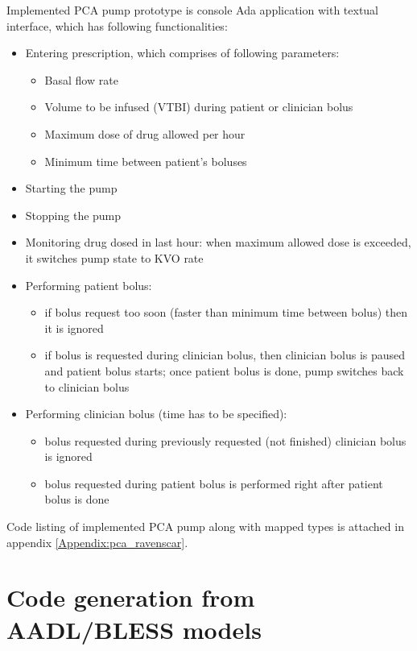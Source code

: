 Implemented PCA pump prototype is console Ada application with textual interface, which has following functionalities:
\begin{itemize}
	\item Entering prescription, which comprises of following parameters:
		\begin{itemize}
			\item Basal flow rate
			\item Volume to be infused (VTBI) during patient or clinician bolus
			\item Maximum dose of drug allowed per hour
			\item Minimum time between patient's boluses
		\end{itemize}
	\item Starting the pump
	\item Stopping the pump
	\item Monitoring drug dosed in last hour: when maximum allowed dose is exceeded, it switches pump state to KVO rate
	\item Performing patient bolus:
		\begin{itemize}
			\item if bolus request too soon (faster than minimum time between bolus) then it is ignored
			\item if bolus is requested during clinician bolus, then clinician bolus is paused and patient bolus starts; once patient bolus is done, pump switches back to clinician bolus
		\end{itemize}
	\item Performing clinician bolus (time has to be specified):
		\begin{itemize}
			\item bolus requested during previously requested (not finished) clinician bolus is ignored
			\item bolus requested during patient bolus is performed right after patient bolus is done
		\end{itemize}
\end{itemize}

Code listing of implemented PCA pump along with mapped types is attached in appendix \ref{Appendix:pca_ravenscar}.



\section{Code generation from AADL/BLESS models}
\label{pcapumpimpl:codegen}

